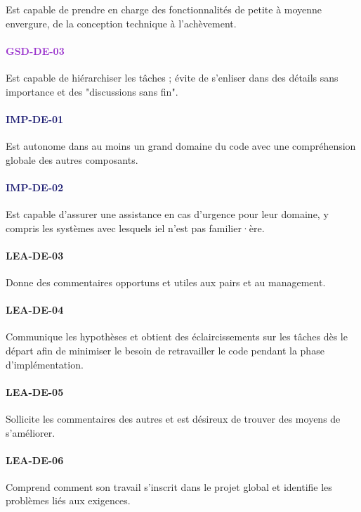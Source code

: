 \documentclass[a4paper, french, openany, 12pt]{book}
\newcommand\str[1]{\textcolor{DarkOrchid}{\textbf{\uppercase{gsd-{#1}}}}}
\newcommand\wis[1]{\textcolor{MidnightBlue}{\textbf{\uppercase{imp-{#1}}}}}
\newcommand\cha[1]{\textcolor{OliveGreen}{\textbf{\uppercase{lea-{#1}}}}}
\begin{document}
\begin{multicols}{2}
  Est capable de prendre en charge des fonctionnalités de petite à moyenne envergure, de la conception technique à 
  l'achèvement.

  \paragraph*{\str{de-03}}

  Est capable de hiérarchiser les tâches ; évite de s'enliser dans des détails sans importance et des "discussions sans 
  fin".

  \paragraph*{\wis{de-01}}

  Est autonome dans au moins un grand domaine du code avec une compréhension globale des autres composants.

  \paragraph*{\wis{de-02}}

  Est capable d'assurer une assistance en cas d'urgence pour leur domaine, y compris les systèmes avec lesquels iel 
  n'est pas familier·ère.

  \paragraph*{\cha{de-03}}

  Donne des commentaires opportuns et utiles aux pairs et au management.

  \paragraph*{\cha{de-04}}

  Communique les hypothèses et obtient des éclaircissements sur les tâches dès le départ afin de minimiser le besoin de 
  retravailler le code pendant la phase d'implémentation.

  \paragraph*{\cha{de-05}}

  Sollicite les commentaires des autres et est désireux de trouver des moyens de s'améliorer.

  \paragraph*{\cha{de-06}}

  Comprend comment son travail s'inscrit dans le projet global et identifie les problèmes liés aux exigences.

\end{multicols}
\end{document}
